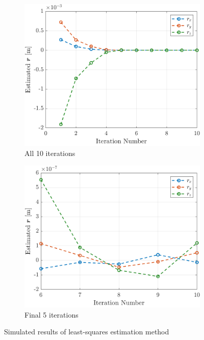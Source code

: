 \begin{figure}[ht]
  \centering
  \begin{subfigure}[t]{0.47\textwidth}
    \includegraphics[width=\linewidth]{plots/LSR_sim_all_runs.png}
    \caption{All 10 iterations}\label{fig:LSR_sim_runs_a}
  \end{subfigure}\hfill
  \begin{subfigure}[t]{0.47\textwidth}
    \includegraphics[width=\linewidth]{plots/LSR_sim_last_5_runs.png}
    \caption{Final 5 iterations}\label{fig:LSR_sim_runs_b}
  \end{subfigure}
  \caption{Simulated results of least-squares estimation method}
  \label{fig:LSR_sim_runs}
\end{figure}

